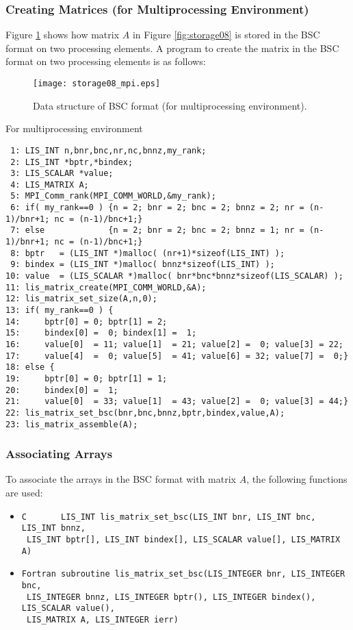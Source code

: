 \documentclass[a4paper]{article}
\begin{document}
\newpage
\subsubsection{Creating Matrices (for Multiprocessing Environment)}
Figure \ref{fig:storage08_mpi} shows how matrix $A$ in Figure
\ref{fig:storage08} is stored in the BSC format on two processing
elements. A program to create the matrix in the BSC format on two processing elements is as follows:
\begin{figure}[h]
{\centering 
\texttt{[image: storage08\_mpi.eps]} 
\caption{Data structure of BSC format (for multiprocessing environment).}\label{fig:storage08_mpi}}
\end{figure}
\begin{itemsquarebox}[l]{For multiprocessing environment}
\small
\begin{verbatim}
 1: LIS_INT n,bnr,bnc,nr,nc,bnnz,my_rank;
 2: LIS_INT *bptr,*bindex;
 3: LIS_SCALAR *value;
 4: LIS_MATRIX A;
 5: MPI_Comm_rank(MPI_COMM_WORLD,&my_rank);
 6: if( my_rank==0 ) {n = 2; bnr = 2; bnc = 2; bnnz = 2; nr = (n-1)/bnr+1; nc = (n-1)/bnc+1;}
 7: else             {n = 2; bnr = 2; bnc = 2; bnnz = 1; nr = (n-1)/bnr+1; nc = (n-1)/bnc+1;}
 8: bptr   = (LIS_INT *)malloc( (nr+1)*sizeof(LIS_INT) );
 9: bindex = (LIS_INT *)malloc( bnnz*sizeof(LIS_INT) );
10: value  = (LIS_SCALAR *)malloc( bnr*bnc*bnnz*sizeof(LIS_SCALAR) );
11: lis_matrix_create(MPI_COMM_WORLD,&A);
12: lis_matrix_set_size(A,n,0);
13: if( my_rank==0 ) {
14:     bptr[0] = 0; bptr[1] = 2;
15:     bindex[0] =  0; bindex[1] =  1;
16:     value[0]  = 11; value[1]  = 21; value[2] =  0; value[3] = 22;
17:     value[4]  =  0; value[5]  = 41; value[6] = 32; value[7] =  0;}
18: else {
19:     bptr[0] = 0; bptr[1] = 1;
20:     bindex[0] =  1;
21:     value[0]  = 33; value[1]  = 43; value[2] =  0; value[3] = 44;}
22: lis_matrix_set_bsc(bnr,bnc,bnnz,bptr,bindex,value,A);
23: lis_matrix_assemble(A);
\end{verbatim}
\end{itemsquarebox}

\subsubsection{Associating Arrays}
To associate the arrays in the BSC format with matrix $A$, the following functions are used:
\begin{itemize}
\item \verb|C       LIS_INT lis_matrix_set_bsc(LIS_INT bnr, LIS_INT bnc, LIS_INT bnnz,|\\
      \verb| LIS_INT bptr[], LIS_INT bindex[], LIS_SCALAR value[], LIS_MATRIX A)|
\item \verb|Fortran subroutine lis_matrix_set_bsc(LIS_INTEGER bnr, LIS_INTEGER bnc,|\\
      \verb| LIS_INTEGER bnnz, LIS_INTEGER bptr(), LIS_INTEGER bindex(), LIS_SCALAR value(),|\\
      \verb| LIS_MATRIX A, LIS_INTEGER ierr)|
\end{itemize}
\end{document}
